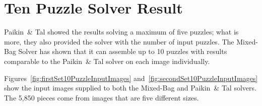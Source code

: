 \chapter{Ten Puzzle Solver Result}

Paikin~\& Tal \cite{paikin2015} showed the results solving a maximum of five puzzles; what is more, they also provided the solver with the number of input puzzles.  The Mixed-Bag Solver has shown that it can assemble up to 10 puzzles with results comparable to the Paikin~\& Tal solver on each image individually.

Figures~\ref{fig:firstSet10PuzzleInputImages} and~\ref{fig:secondSet10PuzzleInputImages} show the input images supplied to both the Mixed-Bag and Paikin~\& Tal solvers. The 5,850 pieces come from images that are five different sizes.

